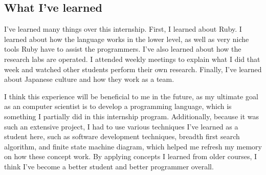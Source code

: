 \subsection{What I've learned}

I've learned many things over this internship.  First, I learned about Ruby.  I learned about how the language works in the lower level, as well as very niche tools Ruby have to assist the programmers.  I've also learned about how the research labs are operated.  I attended weekly meetings to explain what I did that week and watched other students perform their own research.  Finally, I've learned about Japanese culture and how they work as a team.

I think this experience will be beneficial to me in the future, as my ultimate goal as an computer scientist is to develop a programming language, which is something I partially did in this internship program.  Additionally, because it was such an extensive project, I had to use various techniques I've learned as a student here, such as software development techniques, breadth first search algorithm, and finite state machine diagram, which helped me refresh my memory on how these concept work.  By applying concepts I learned from older courses, I think I've become a better student and better programmer overall.
